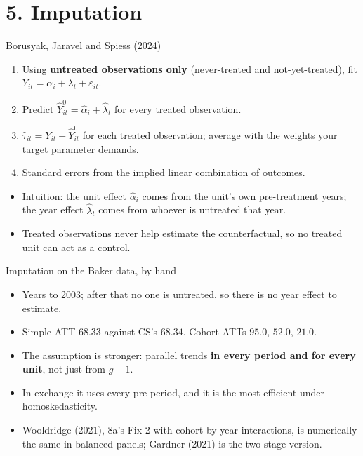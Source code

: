 \documentclass[
  11pt,
  ignorenonframetext,
  aspectratio=169,
]{beamer}
\providecommand{\tightlist}{%
  \setlength{\itemsep}{0pt}\setlength{\parskip}{0pt}}
\begin{document}
\section{5. Imputation}\label{imputation}

\begin{frame}{Borusyak, Jaravel and Spiess (2024)}
\protect{}\label{borusyak-jaravel-and-spiess-2024}
\begin{enumerate}
\tightlist
\item
  Using \textbf{untreated observations only} (never-treated and
  not-yet-treated), fit
  \(Y_{it} = \alpha_i + \lambda_t + \varepsilon_{it}\).
\item
  Predict \(\hat Y^0_{it} = \hat\alpha_i + \hat\lambda_t\) for every
  treated observation.
\item
  \(\hat\tau_{it} = Y_{it} - \hat Y^0_{it}\) for each treated
  observation; average with the weights your target parameter demands.
\item
  Standard errors from the implied linear combination of outcomes.
\end{enumerate}

\vspace{0.4em}

\begin{itemize}
\tightlist
\item
  Intuition: the unit effect \(\hat\alpha_i\) comes from the unit's own
  pre-treatment years; the year effect \(\hat\lambda_t\) comes from
  whoever is untreated that year.
\item
  Treated observations never help estimate the counterfactual, so no
  treated unit can act as a control.
\end{itemize}
\end{frame}

\begin{frame}{Imputation on the Baker data, by hand}
\protect{}\label{imputation-on-the-baker-data-by-hand}
\begin{itemize}
\tightlist
\item
  Years to 2003; after that no one is untreated, so there is no year
  effect to estimate.
\item
  Simple ATT \(68.33\) against CS's \(68.34\). Cohort ATTs \(95.0\),
  \(52.0\), \(21.0\).
\end{itemize}

\vspace{0.4em}

\begin{itemize}
\tightlist
\item
  The assumption is stronger: parallel trends \textbf{in every period
  and for every unit}, not just from \(g - 1\).
\item
  In exchange it uses every pre-period, and it is the most efficient
  under homoskedasticity.
\item
  Wooldridge (2021), 8a's Fix 2 with cohort-by-year interactions, is
  numerically the same in balanced panels; Gardner (2021) is the
  two-stage version.
\end{itemize}
\end{frame}
\end{document}
